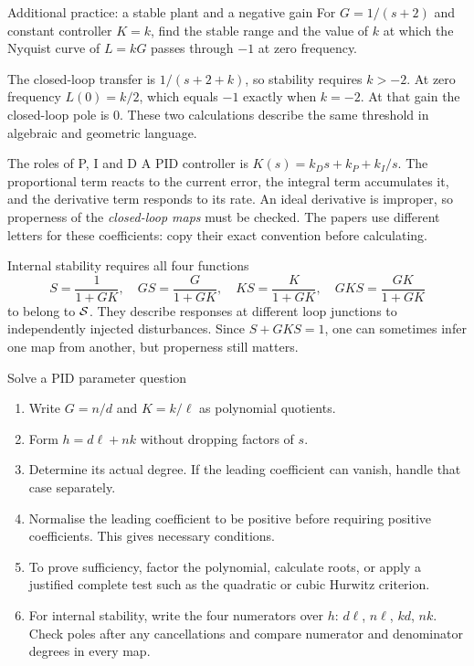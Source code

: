 \begin{question}{Additional practice: a stable plant and a negative gain}
For $G=1/(s+2)$ and constant controller $K=k$, find the stable range and the value of $k$ at which the Nyquist curve of $L=kG$ passes through $-1$ at zero frequency.
\end{question}
\begin{answer}
The closed-loop transfer is $1/(s+2+k)$, so stability requires $k>-2$. At zero frequency $L(0)=k/2$, which equals $-1$ exactly when $k=-2$. At that gain the closed-loop pole is $0$. These two calculations describe the same threshold in algebraic and geometric language.
\end{answer}

\begin{concept}{The roles of P, I and D}
A PID controller is $K(s)=k_Ds+k_P+k_I/s$. The proportional term reacts to the current error, the integral term accumulates it, and the derivative term responds to its rate. An ideal derivative is improper, so properness of the \emph{closed-loop maps} must be checked. The papers use different letters for these coefficients: copy their exact convention before calculating.

Internal stability requires all four functions
\[S=\frac1{1+GK},\quad GS=\frac G{1+GK},\quad KS=\frac K{1+GK},\quad GKS=\frac{GK}{1+GK}\]
to belong to $\mathcal S$. They describe responses at different loop junctions to independently injected disturbances. Since $S+GKS=1$, one can sometimes infer one map from another, but properness still matters.
\end{concept}
\begin{method}{Solve a PID parameter question}
\begin{enumerate}
\item Write $G=n/d$ and $K=k/\ell$ as polynomial quotients.
\item Form $h=d\ell+nk$ without dropping factors of $s$.
\item Determine its actual degree. If the leading coefficient can vanish, handle that case separately.
\item Normalise the leading coefficient to be positive before requiring positive coefficients. This gives necessary conditions.
\item To prove sufficiency, factor the polynomial, calculate roots, or apply a justified complete test such as the quadratic or cubic Hurwitz criterion.
\item For internal stability, write the four numerators over $h$: $d\ell$, $n\ell$, $kd$, $nk$. Check poles after any cancellations and compare numerator and denominator degrees in every map.
\end{enumerate}
\end{method}
